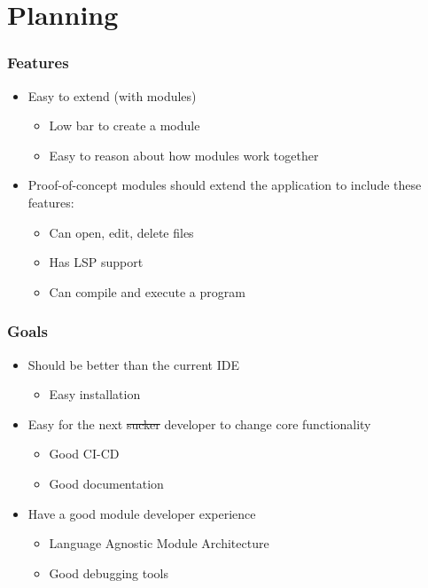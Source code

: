 \section{Planning}
\SectionPage

\begin{frame}
  \frametitle{Features}
  \begin{itemize}
    \item Easy to extend (with modules)
      \pause
      \begin{itemize}
        \item Low bar to create a module
          \pause
        \item Easy to reason about how modules work together
          \pause
      \end{itemize}
    \item Proof-of-concept modules should extend the application to include
      these features:
      \pause
      \begin{itemize}
        \item Can open, edit, delete files
          \pause
        \item Has LSP support
          \pause
        \item Can compile and execute a program
      \end{itemize}
  \end{itemize}
\end{frame}

\begin{frame}
  \frametitle{Goals}
  \begin{itemize}
    \item Should be better than the current IDE
      \pause
      \begin{itemize}
        \item Easy installation
      \end{itemize}
      \pause
    \item Easy for the next \sout{sucker} developer to change core functionality
      \pause
      \begin{itemize}
        \item Good CI-CD
        \pause
        \item Good documentation
        \pause
      \end{itemize}
    \item Have a good module developer experience
      \begin{itemize}
          \pause
        \item Language Agnostic Module Architecture
          \pause
        \item Good debugging tools
      \end{itemize}
  \end{itemize}
\end{frame}

